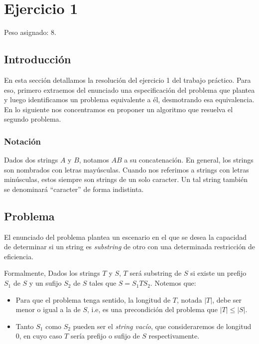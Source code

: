 \section{Ejercicio 1}

Peso asignado: 8.

\subsection{Introducción}

En esta sección detallamos la resolución del ejercicio 1 del trabajo práctico. Para eso, primero extraemos del enunciado una especificación del problema que plantea y luego identificamos un problema equivalente a él, desmotrando esa equivalencia. En lo siguiente nos concentramos en proponer un algoritmo que resuelva el segundo problema.

\subsubsection{Notación}

Dados dos strings $A$ y $B$, notamos $AB$ a su concatenación. En general, los strings son nombrados con letras mayúsculas. Cuando nos referimos a strings con letras minúsculas, estos siempre son strings de un solo caracter. Un tal string también se denominará ``caracter'' de forma indistinta.

\subsection{Problema}

El enunciado del problema plantea un escenario en el que se desea la capacidad de determinar si un string es \textit{substring} de otro con una determinada restricción de eficiencia.

Formalmente, Dados los strings $T$ y $S$, $T$ será substring de $S$ si existe un prefijo $S_1$ de $S$ y un sufijo $S_2$ de $S$ tales que $S = S_1 T S_2$. Notemos que:
\begin{itemize}
\item Para que el problema tenga sentido, la longitud de $T$, notada $|T|$, debe ser menor o igual a la de $S$, i.e, es una precondición del problema que $|T| \leq |S|$.
\item Tanto $S_1$ como $S_2$ pueden ser el \textit{string vacío}, que consideraremos de longitud $0$, en cuyo caso $T$ sería prefijo o sufijo de $S$ respectivamente.
\end{itemize}

